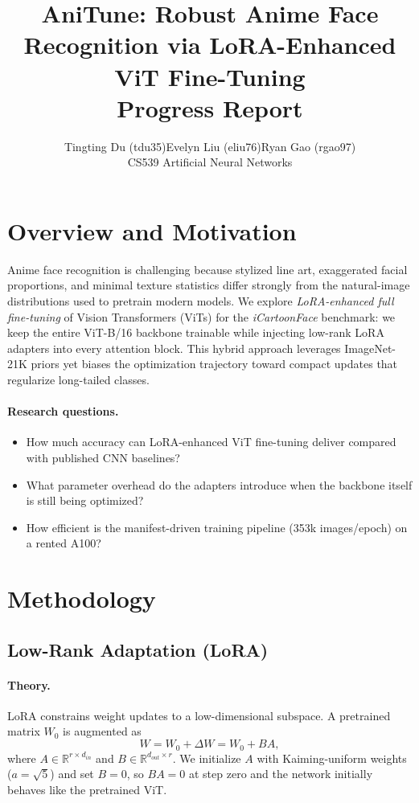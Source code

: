 \documentclass[11pt]{article}
\title{\vspace{-1.5em}\Large\textbf{AniTune: Robust Anime Face Recognition via LoRA-Enhanced ViT Fine-Tuning}\\[-0.25em]
\large Progress Report\vspace{-0.5em}}
\author{Tingting Du (tdu35)\quad Evelyn Liu (eliu76)\quad Ryan Gao (rgao97)\\[0.25em]
\small CS539 Artificial Neural Networks}
\date{}
\begin{document}
\maketitle

\section{Overview and Motivation}

Anime face recognition is challenging because stylized line art, exaggerated facial proportions, and minimal texture statistics differ strongly from the natural-image distributions used to pretrain modern models. We explore \emph{LoRA-enhanced full fine-tuning} of Vision Transformers (ViTs) for the \emph{iCartoonFace} benchmark\cite{zheng2020icartoonface}: we keep the entire ViT-B/16 backbone trainable while injecting low-rank LoRA adapters into every attention block. This hybrid approach leverages ImageNet-21K priors yet biases the optimization trajectory toward compact updates that regularize long-tailed classes.

\paragraph{Research questions.}
\begin{itemize}
    \item How much accuracy can LoRA-enhanced ViT fine-tuning deliver compared with published CNN baselines?
    \item What parameter overhead do the adapters introduce when the backbone itself is still being optimized?
    \item How efficient is the manifest-driven training pipeline (353k images/epoch) on a rented A100?
\end{itemize}

\section{Methodology}

\subsection{Low-Rank Adaptation (LoRA)}

\paragraph{Theory.} LoRA constrains weight updates to a low-dimensional subspace. A pretrained matrix $W_0$ is augmented as
\begin{equation}
    W = W_0 + \Delta W = W_0 + BA,
\end{equation}
where $A \in \mathbb{R}^{r \times d_{in}}$ and $B \in \mathbb{R}^{d_{out} \times r}$. We initialize $A$ with Kaiming-uniform weights ($a = \sqrt{5}$) and set $B=0$, so $BA=0$ at step zero and the network initially behaves like the pretrained ViT.
\end{document}
